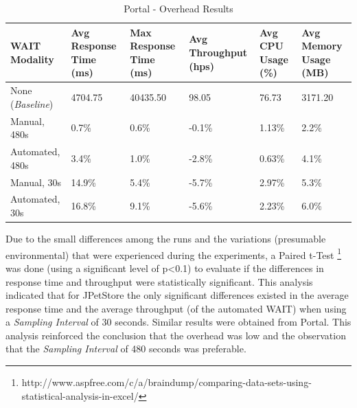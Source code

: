 \documentclass[runningheads,a4paper]{llncs}
\begin{document}
\begin{table}[!h]
\caption{Portal - Overhead Results}
\label{Portal1}
\centering
\begin{tabular}{p{}|p{}|p{}|p{}|p{}|p{}}
\hline
\bfseries WAIT Modality & \bfseries Avg Response Time (ms)& \bfseries Max
Response Time (ms)& \bfseries Avg Throughput (hps)& \bfseries Avg CPU Usage
(\%) & \bfseries Avg Memory Usage (MB)\\
\hline
None (\emph{Baseline}) 	& 4704.75	& 40435.50	& 98.05 	& 76.73 	& 3171.20\\
Manual, 480s 			& 0.7\% 	& 0.6\%		& -0.1\%	& 1.13\% 	& 2.2\%\\
Automated, 480s 		& 3.4\%		& 1.0\%		& -2.8\% 	& 0.63\% 	& 4.1\%\\
Manual, 30s 			& 14.9\%	& 5.4\%		& -5.7\% 	& 2.97\% 	& 5.3\%\\
Automated, 30s 			& 16.8\%	& 9.1\%		& -5.6\% 	& 2.23\% 	& 6.0\%\\
\hline
\end{tabular}
\end{table}

Due to the small differences among the runs and the variations (presumable
environmental) that were experienced during the experiments, a Paired t-Test
\footnote{http://www.aspfree.com/c/a/braindump/comparing-data-sets-using-statistical-analysis-in-excel/}
was done (using a significant level of p\textless0.1) to evaluate if the
differences in response time and throughput were statistically significant. 
This analysis indicated that 
for JPetStore the only significant differences existed in the average response
time and the average throughput (of the automated WAIT) when using a
\emph{Sampling Interval} of 30 seconds. Similar results were obtained from Portal. This analysis reinforced the
conclusion that the overhead was low and the observation that the
\emph{Sampling Interval} of 480 seconds was preferable.
\end{document}
